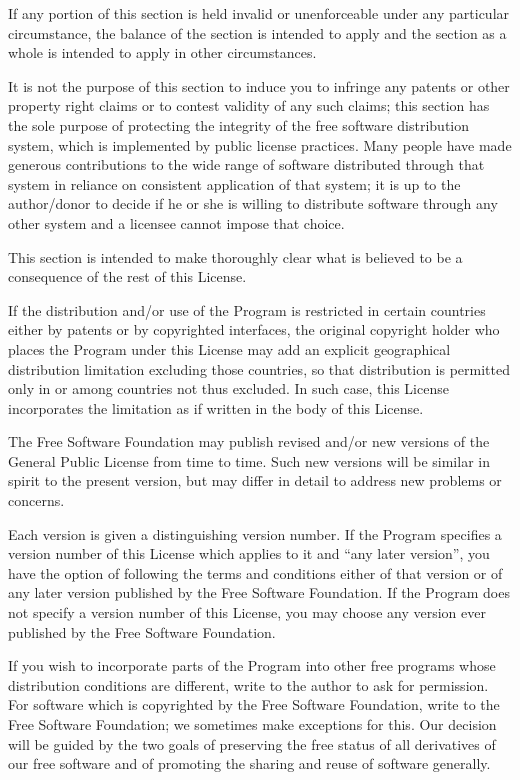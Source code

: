 \begin{lrbox}{\gpl}
\begin{minipage}{3\textwidth}
If any portion of this section is held invalid or unenforceable under
any particular circumstance, the balance of the section is intended to
apply and the section as a whole is intended to apply in other
circumstances.

It is not the purpose of this section to induce you to infringe any
patents or other property right claims or to contest validity of any
such claims; this section has the sole purpose of protecting the
integrity of the free software distribution system, which is
implemented by public license practices.  Many people have made
generous contributions to the wide range of software distributed
through that system in reliance on consistent application of that
system; it is up to the author/donor to decide if he or she is willing
to distribute software through any other system and a licensee cannot
impose that choice.

This section is intended to make thoroughly clear what is believed to
be a consequence of the rest of this License.

\item
If the distribution and/or use of the Program is restricted in
certain countries either by patents or by copyrighted interfaces, the
original copyright holder who places the Program under this License
may add an explicit geographical distribution limitation excluding
those countries, so that distribution is permitted only in or among
countries not thus excluded.  In such case, this License incorporates
the limitation as if written in the body of this License.

\item
The Free Software Foundation may publish revised and/or new versions
of the General Public License from time to time.  Such new versions will
be similar in spirit to the present version, but may differ in detail to
address new problems or concerns.

Each version is given a distinguishing version number.  If the Program
specifies a version number of this License which applies to it and ``any
later version'', you have the option of following the terms and conditions
either of that version or of any later version published by the Free
Software Foundation.  If the Program does not specify a version number of
this License, you may choose any version ever published by the Free Software
Foundation.

\item
If you wish to incorporate parts of the Program into other free
programs whose distribution conditions are different, write to the author
to ask for permission.  For software which is copyrighted by the Free
Software Foundation, write to the Free Software Foundation; we sometimes
make exceptions for this.  Our decision will be guided by the two goals
of preserving the free status of all derivatives of our free software and
of promoting the sharing and reuse of software generally.


\end{minipage}
\end{lrbox}
